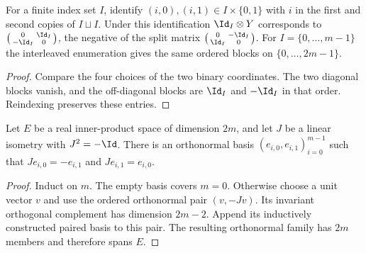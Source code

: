 \begin{lemma}
    \label{lem:mpu_standard_skew_indexing}
    \leanok
    For a finite index set $I$, identify $(i,0),(i,1)\in I\times\{0,1\}$
    with $i$ in the first and second copies of $I\sqcup I$. Under this
    identification $\Id_I\otimes Y$ corresponds to
    $\left(\begin{smallmatrix}0&\Id_I\\-\Id_I&0\end{smallmatrix}\right)$,
    the negative of the split matrix
    $\left(\begin{smallmatrix}0&-\Id_I\\\Id_I&0\end{smallmatrix}\right)$.
    For $I=\{0,\ldots,m-1\}$ the interleaved enumeration gives the same
    ordered blocks on $\{0,\ldots,2m-1\}$.
\end{lemma}

\begin{proof}\leanok
    Compare the four choices of the two binary coordinates. The two diagonal
    blocks vanish, and the off-diagonal blocks are $\Id_I$ and $-\Id_I$
    in that order. Reindexing preserves these entries.
\end{proof}

\begin{lemma}
    \label{lem:mpu_skew_paired_orthonormal_basis}
    \leanok
    Let $E$ be a real inner-product space of dimension $2m$, and let $J$ be
    a linear isometry with $J^2=-\Id$. There is an orthonormal basis
    $(e_{i,0},e_{i,1})_{i=0}^{m-1}$ such that
    $Je_{i,0}=-e_{i,1}$ and $Je_{i,1}=e_{i,0}$.
\end{lemma}

\begin{proof}\leanok
    Induct on $m$. The empty basis covers $m=0$. Otherwise choose a unit
    vector $v$ and use the ordered orthonormal pair $(v,-Jv)$.
    Its invariant orthogonal complement has dimension $2m-2$.
    Append its inductively constructed paired basis to this pair.
    The resulting orthonormal family has $2m$ members and therefore spans $E$.
\end{proof}

